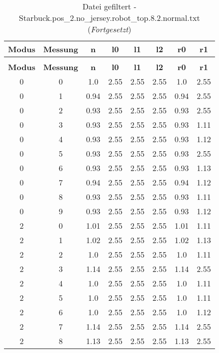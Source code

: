 \clearpage{}
\begin{longtable}{|c|c||c||c|c|c||c|c|}
	\caption{Datei gefiltert - Starbuck.pos\_2.no\_jersey.robot\_top.8.2.normal.txt} \label{tab:Starbuck.pos-2.no-jersey.robot-top.8.2.normal.txt} \\ \hline
	\textbf{Modus} & \textbf{Messung} & \textbf{n} & \textbf{l0} & \textbf{l1} & \textbf{l2} & \textbf{r0} & \textbf{r1}\\ \hline
	\endfirsthead
	\caption[]{Datei gefiltert - Starbuck.pos\_2.no\_jersey.robot\_top.8.2.normal.txt (\emph{Fortgesetzt})} \\ \hline
	\textbf{Modus} & \textbf{Messung} & \textbf{n} & \textbf{l0} & \textbf{l1} & \textbf{l2} & \textbf{r0} & \textbf{r1}\\ \hline
	\endhead
	0 & 0 & 1.0 & 2.55 & 2.55 & 2.55 & 1.0 & 2.55 \\ \hline
	0 & 1 & 0.94 & 2.55 & 2.55 & 2.55 & 0.94 & 2.55 \\ \hline
	0 & 2 & 0.93 & 2.55 & 2.55 & 2.55 & 0.93 & 2.55 \\ \hline
	0 & 3 & 0.93 & 2.55 & 2.55 & 2.55 & 0.93 & 1.11 \\ \hline
	0 & 4 & 0.93 & 2.55 & 2.55 & 2.55 & 0.93 & 1.12 \\ \hline
	0 & 5 & 0.93 & 2.55 & 2.55 & 2.55 & 0.93 & 2.55 \\ \hline
	0 & 6 & 0.93 & 2.55 & 2.55 & 2.55 & 0.93 & 1.13 \\ \hline
	0 & 7 & 0.94 & 2.55 & 2.55 & 2.55 & 0.94 & 1.12 \\ \hline
	0 & 8 & 0.93 & 2.55 & 2.55 & 2.55 & 0.93 & 1.11 \\ \hline
	0 & 9 & 0.93 & 2.55 & 2.55 & 2.55 & 0.93 & 1.12 \\ \hline
	2 & 0 & 1.01 & 2.55 & 2.55 & 2.55 & 1.01 & 1.11 \\ \hline
	2 & 1 & 1.02 & 2.55 & 2.55 & 2.55 & 1.02 & 1.13 \\ \hline
	2 & 2 & 1.0 & 2.55 & 2.55 & 2.55 & 1.0 & 1.11 \\ \hline
	2 & 3 & 1.14 & 2.55 & 2.55 & 2.55 & 1.14 & 2.55 \\ \hline
	2 & 4 & 1.0 & 2.55 & 2.55 & 2.55 & 1.0 & 1.11 \\ \hline
	2 & 5 & 1.0 & 2.55 & 2.55 & 2.55 & 1.0 & 1.11 \\ \hline
	2 & 6 & 1.0 & 2.55 & 2.55 & 2.55 & 1.0 & 1.12 \\ \hline
	2 & 7 & 1.14 & 2.55 & 2.55 & 2.55 & 1.14 & 2.55 \\ \hline
	2 & 8 & 1.13 & 2.55 & 2.55 & 2.55 & 1.13 & 2.55 \\ \hline

\end{longtable}

